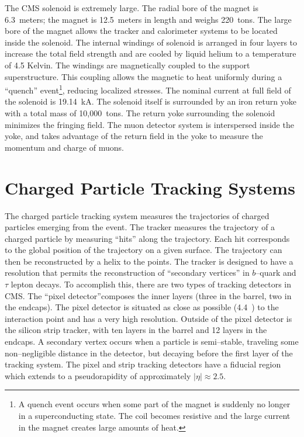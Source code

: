 The CMS solenoid is extremely large.  The radial bore of the magnet is
6.3~meters; the magnet is 12.5~meters in length and weighs 220~tons.  The large
bore of the magnet allows the tracker and calorimeter systems to be located
inside the solenoid.  The internal windings of solenoid is arranged in four
layers to increase the total field strength and are cooled by liquid helium to
a temperature of 4.5 Kelvin.  The windings are magnetically
coupled to the support superstructure.  This coupling allows the magnetic to
heat uniformly during a ``quench'' event\footnote{A quench event occurs when some part
of the magnet is suddenly no longer in a superconducting state.  The coil
becomes resistive and the large current in the magnet creates large amounts of
heat.}, reducing localized stresses.  The
nominal current at full field of the solenoid is 19.14~kA.  The solenoid itself
is surrounded by an iron return yoke with a total mass of 10,000~tons.  The
return yoke surrounding the solenoid minimizes the fringing field.  The muon
detector system is interspersed inside the yoke, and takes advantage of the
return field in the yoke to measure the momentum and charge of muons.
%
\section{Charged Particle Tracking Systems}
\label{sec:Tracker}

The charged particle tracking system measures the trajectories of charged
particles emerging from the event.  The tracker measures the trajectory of a
charged particle by measuring ``hits'' along the trajectory.  Each hit
corresponds to the global position of the trajectory on a given surface.  The
trajectory can then be reconstructed by a helix to the points.  The tracker is
designed to have a resolution that permits the reconstruction of ``secondary
vertices'' in $b$--quark and $\tau$ lepton decays.  To accomplish this, there
are two types of tracking detectors in CMS\@.  The ``pixel detector''composes
the inner layers (three in the barrel, two in the endcaps).  The pixel detector
is  situated as close as possible (4.4~\cm) to the interaction point and has a
very high resolution. Outside of the pixel detector is the silicon strip
tracker, with ten layers in the barrel and 12 layers in the endcaps.  A
secondary vertex occurs when a particle is semi--stable, traveling some
non--negligible distance in the detector, but decaying before the first layer of
the tracking system.  The pixel and strip tracking detectors have a fiducial
region which extends to a pseudorapidity of approximately $|\eta| \approx 2.5$.

